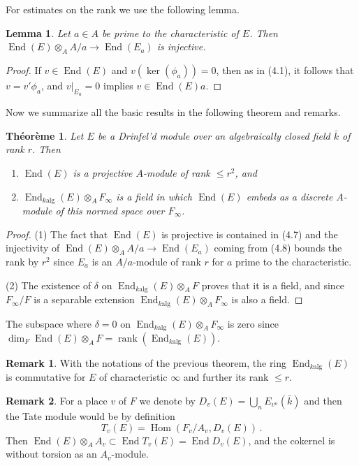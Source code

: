 \documentclass[12pt,a4paper]{article}
\theoremstyle{plain}
\newtheorem{theorem}{Th\'eor\`eme}[section]
\newtheorem{lemma}{Lemma}[section]
\theoremstyle{definition}
\newtheorem{remark}{Remark}[section]
\theoremstyle{remark}
\DeclareMathOperator{\End}{End}
\DeclareMathOperator{\Hom}{Hom}
\DeclareMathOperator{\rank}{rank}
\begin{document}
For estimates on the rank we use the following lemma.

\begin{lemma}
Let $a \in A$ be prime to the characteristic of $E$. Then 
$\End(E) \otimes_A A/a \to \End(E_a)$ is injective.
\end{lemma}

\begin{proof}
If $v \in \End(E)$ and $v(\ker(\phi_a)) = 0$, then as in (4.1), it follows that 
$v = v'\phi_a$, and $v|_{E_a} = 0$ implies $v \in \End(E)a$.
\end{proof}

Now we summarize all the basic results in the following theorem and remarks.

\begin{theorem}
Let $E$ be a Drinfel'd module over an algebraically closed field $\bar{k}$ of 
rank $r$. Then
\begin{enumerate}[label=(\arabic*)]
\item $\End(E)$ is a projective $A$-module of rank $\leqslant r^2$, and
\item $\End_{k\text{alg}}(E) \otimes_A F_\infty$ is a field in which $\End(E)$ 
embeds as a discrete $A$-module of this normed space over $F_\infty$.
\end{enumerate}
\end{theorem}

\begin{proof}
(1) The fact that $\End(E)$ is projective is contained in (4.7) and the 
injectivity of $\End(E) \otimes_A A/a \to \End(E_a)$ coming from (4.8) bounds 
the rank by $r^2$ since $E_a$ is an $A/a$-module of rank $r$ for $a$ prime 
to the characteristic.

(2) The existence of $\delta$ on $\End_{k\text{alg}}(E) \otimes_A F$ proves that 
it is a field, and since $F_\infty/F$ is a separable extension 
$\End_{k\text{alg}}(E) \otimes_A F_\infty$ is also a field.
\end{proof}

The subspace where $\delta = 0$ on $\End_{k\text{alg}}(E) \otimes_A F_\infty$ is 
zero since $\dim_F \End(E) \otimes_A F = \rank(\End_{k\text{alg}}(E))$.

\begin{remark}
With the notations of the previous theorem, the ring $\End_{k\text{alg}}(E)$ is 
commutative for $E$ of characteristic $\infty$ and further its rank 
$\leqslant r$.
\end{remark}

\begin{remark}
For a place $v$ of $F$ we denote by $D_v(E) = \bigcup_n E_{v^n}(\bar{k})$ and 
then the Tate module would be by definition
\[
T_v(E) = \Hom(F_v/A_v, D_v(E)) \,.
\]
Then $\End(E) \otimes_A A_v \subset \End T_v(E) = \End D_v(E)$, and the 
cokernel is without torsion as an $A_v$-module.
\end{remark}
\end{document}
